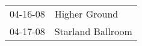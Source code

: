 \begin{supertabular}{p{0.25\columnwidth}p{0.75\columnwidth}}
 04-16-08 &      Higher Ground \\
 04-17-08 &  Starland Ballroom \\
\end{supertabular}
